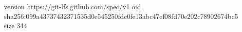 version https://git-lfs.github.com/spec/v1
oid sha256:099a43737432371535d0e545250fdc0fe13abc47ef08fd70e202c78902674bc5
size 344
